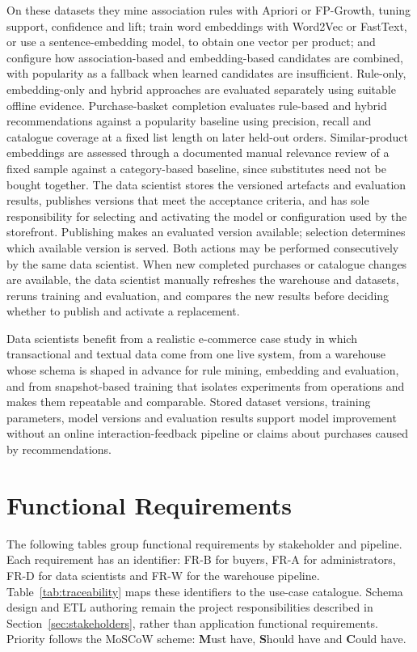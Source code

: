 \documentclass[a4paper,12pt]{article}
\begin{document}
On these datasets they mine association rules with Apriori or FP-Growth, tuning support, confidence
and lift; train word embeddings with Word2Vec or FastText, or use a sentence-embedding model, to obtain
one vector per product; and configure how association-based and embedding-based candidates are
combined, with popularity as a fallback when learned candidates are insufficient. Rule-only,
embedding-only and hybrid approaches are evaluated separately using suitable offline evidence.
Purchase-basket completion evaluates rule-based and hybrid recommendations against a popularity
baseline using precision, recall and catalogue coverage at a fixed list length on later held-out
orders. Similar-product embeddings are assessed through a documented manual relevance review of a
fixed sample against a category-based baseline, since substitutes need not be bought together.
The data scientist stores the versioned artefacts and evaluation results, publishes versions that meet the
acceptance criteria, and has sole responsibility for selecting and activating the model or
configuration used by the storefront. Publishing makes an evaluated version available; selection
determines which available version is served. Both actions may be performed consecutively by the
same data scientist. When new completed purchases or catalogue changes are available, the data
scientist manually refreshes the warehouse and datasets, reruns training and evaluation, and compares
the new results before deciding whether to publish and activate a replacement.

Data scientists benefit from a realistic e-commerce case study in which transactional and textual
data come from one live system, from a warehouse whose schema is shaped in advance for rule mining,
embedding and evaluation, and from snapshot-based training that isolates experiments from operations
and makes them repeatable and comparable. Stored dataset versions, training parameters, model
versions and evaluation results support model improvement without an online interaction-feedback
pipeline or claims about purchases caused by recommendations.

\clearpage
\section{Functional Requirements}
\label{sec:fr}

The following tables group functional requirements by stakeholder and pipeline.
Each requirement has an identifier: FR-B for buyers, FR-A for administrators, FR-D for data scientists
and FR-W for the warehouse pipeline. Table~\ref{tab:traceability} maps these identifiers to the
use-case catalogue. Schema design and ETL authoring remain the project responsibilities described
in Section~\ref{sec:stakeholders}, rather than application functional requirements.
Priority follows the MoSCoW scheme: \textbf{M}ust have, \textbf{S}hould have and
\textbf{C}ould have.
    
\end{document}
